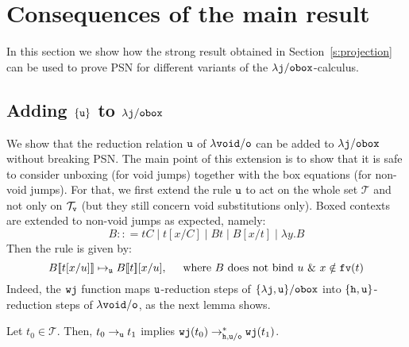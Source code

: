 \documentclass{LMCS}
\newcommand{\sep}{\hspace*{0.5cm}}
\renewcommand{\>}{\rightarrow}
\def\lam{\lambda}
\newcommand{\Rew}[1]{\rightarrow_{#1}}
\newcommand{\rRew}[1]{\mapsto_{#1}}
\newcommand{\Rewnmod}[2]{\rightarrow^*_{#1/#2}}
\newcommand{\dis}{{\tt j}}
\newcommand{\ldis}{\lam{\dis}}
\newcommand{\fv}[1]{{\tt fv}(#1)}
\newcommand{\proj}{\wfc}
\newcommand{\Gc}{{\tt w}}
\newcommand{\set}[1]{ \{ #1 \}}
\newcommand{\terms}{\mathcal{T}}
\newcommand{\termsv}{\mathcal{T}_{\tt v}}
\newcommand{\wfc}{\Gc\dis}
\newcommand{\unboxed}{{\tt u}}
\newcommand{\modulo}[2]{#1/#2}
\newcommand{\osym}{{\tt o}}
\newcommand{\ldisf}{\lam \modulo{\dis}{\fsymb}}
\newcommand{\fsymb}{\osymb\boite}
\newcommand{\osymb}{{\tt o}}
\newcommand{\aux}{{\tt void}}
\newcommand{\lauxm}{\lam\modulo{ \aux }{ \osymb }}
\newcommand{\New}{{\tt h}}
\newcommand{\ctx}[2]{#1 [ \! [#2] \! ]}
\newcommand{\boite}{{\tt box}}
\begin{document}
\section{Consequences of the main result}
\label{s:cons}

In this section we show how the strong result obtained in
  Section~\ref{s:projection} can be used to
  prove PSN for different variants of
the $\ldisf$-calculus.
\subsection{Adding $\set{\unboxed}$ to $\ldisf$}
\label{s:ldisf+n+u}
We show that the reduction relation
$\unboxed$ of
$\lauxm$ can be added to $\ldisf$ without breaking PSN. The main point
of this extension is to show that it is safe to consider unboxing (for void jumps)
 together with the box equations (for non-void jumps). 
For that, we first extend the 
rule $\unboxed$
to act on the whole set $\terms$ and not only on $\termsv$ (but
  they still concern void substitutions only). Boxed contexts are extended to non-void jumps as expected, namely:
\[ B:: = t C \mid  t[x/C] \mid B t \mid B[x/t] \mid \lam y. B \]
Then the rule is given by:
\[ \ctx{B}{t[x/u]}   \rRew{\unboxed}   \ctx{B}{t}[x/u], \sep  \mbox{where } B \mbox{ does not bind } u\ \&\ x\notin\fv{t} \] 
 Indeed, the $\proj$ function maps $\unboxed$-reduction steps of
 $\modulo{\set{\ldis, \unboxed}}{\fsymb}$ into $\set{\New,
   \unboxed}$-reduction steps of $\lauxm$, as the next lemma shows.

\begin{lem}
\label{l:projectionext}
Let $t_0 \in \terms$. Then, 
$t_0 \Rew{\unboxed} t_1$ implies  $\proj(t_0)  \Rewnmod{\New,\unboxed}{\osym}  \proj(t_1)$.
\end{lem}
\end{document}
